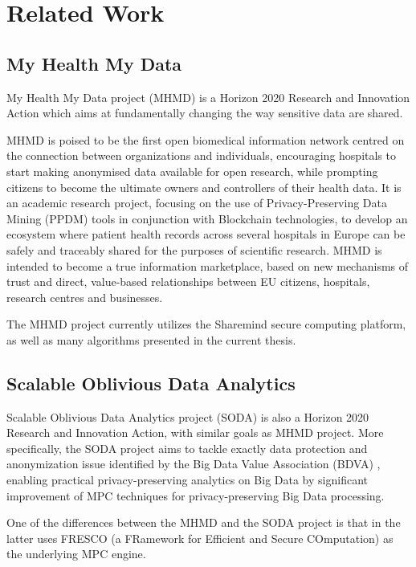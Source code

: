 \chapter{Related Work}\label{c:related-work}

\section{My Health My Data}\label{s:mhmd}
My Health My Data project (MHMD) \cite{mhmd} is a Horizon 2020 Research and Innovation Action which aims at fundamentally changing the way sensitive data are shared.

MHMD is poised to be the first open biomedical information network centred on the connection between organizations and individuals, encouraging hospitals to start making anonymised data available for open research, while prompting citizens to become the ultimate owners and controllers of their health data.
It is an academic research project, focusing on the use of Privacy\hyp Preserving Data Mining (PPDM) tools in conjunction with Blockchain technologies, to develop an ecosystem where patient health records across several hospitals in Europe can be safely and traceably shared for the purposes of scientific research.
MHMD is intended to become a true information marketplace, based on new mechanisms of trust and direct, value-based relationships between EU citizens, hospitals, research centres and businesses.

The MHMD project currently utilizes the Sharemind secure computing platform, as well as many algorithms presented in the current thesis.



\section{Scalable Oblivious Data Analytics}\label{s:soda}
Scalable Oblivious Data Analytics project (SODA) \cite{soda} is also a Horizon 2020 Research and Innovation Action, with similar goals as MHMD project.
More specifically, the SODA project aims to tackle exactly data protection and anonymization issue identified by the Big Data Value Association (BDVA) \cite{bdva}, enabling practical privacy\hyp preserving analytics on Big Data by significant improvement of MPC techniques for privacy\hyp preserving Big Data processing.

One of the differences between the MHMD and the SODA project is that in the  latter uses FRESCO (a FRamework for Efficient and Secure COmputation) \cite{chan2017privacy, alxd1} as the underlying MPC engine.

